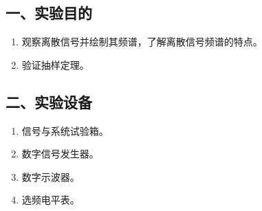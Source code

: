 \documentclass[dvipsnames, svgnames,a4paper,11pt]{article}
\begin{document}
\subsection*{一、实验目的}
\begin{enumerate}
	\item 观察离散信号并绘制其频谱，了解离散信号频谱的特点。
	\item 验证抽样定理。
\end{enumerate}

\subsection*{二、实验设备}
\begin{enumerate}
	\item 信号与系统试验箱。
	\item 数字信号发生器。
	\item 数字示波器。
	\item 选频电平表。
\end{enumerate}
\end{document}
